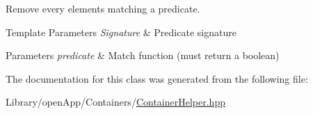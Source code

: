 Remove every elements matching a predicate. 


\begin{DoxyTemplParams}{Template Parameters}
{\em Signature} & Predicate signature \\
\hline
\end{DoxyTemplParams}

\begin{DoxyParams}{Parameters}
{\em predicate} & Match function (must return a boolean) \\
\hline
\end{DoxyParams}


The documentation for this class was generated from the following file\+:\begin{DoxyCompactItemize}
\item 
Library/open\+App/\+Containers/\mbox{\hyperlink{_container_helper_8hpp}{Container\+Helper.\+hpp}}\end{DoxyCompactItemize}
